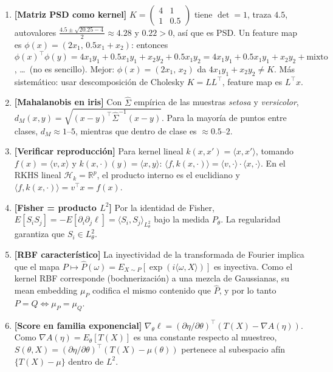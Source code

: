 \begin{enumerate}
	\item \textbf{[Matriz PSD como kernel]} $K = \begin{pmatrix}4&1\\1&0.5\end{pmatrix}$ tiene $\det = 1$, traza $4.5$, autovalores $\frac{4.5\pm\sqrt{20.25-4}}{2} \approx 4.28$ y $0.22 > 0$, así que es PSD. Un feature map es $\phi(x) = (2x_1,\,0.5x_1+x_2)$: entonces $\phi(x)^\top\phi(y) = 4x_1y_1 + 0.5x_1y_1 + x_2y_2 + 0.5x_1y_2 = 4x_1y_1 + 0.5x_1y_1 + x_2y_2 + \text{mixto}$, \dots\ (no es sencillo). Mejor: $\phi(x) = (2x_1,\,x_2)$ da $4x_1y_1 + x_2y_2 \neq K$. Más sistemático: usar descomposición de Cholesky $K = LL^\top$, feature map es $L^\top x$.

	\item \textbf{[Mahalanobis en iris]} Con $\widehat{\Sigma}$ empírica de las muestras \textit{setosa} y \textit{versicolor}, $d_M(x,y) = \sqrt{(x-y)^\top\widehat{\Sigma}^{-1}(x-y)}$. Para la mayoría de puntos entre clases, $d_M \approx 1$--$5$, mientras que dentro de clase es $\approx 0.5$--$2$.

	\item \textbf{[Verificar reproducción]} Para kernel lineal $k(x,x') = \langle x,x'\rangle$, tomando $f(x) = \langle v,x\rangle$ y $k(x,\cdot)(y) = \langle x,y\rangle$: $\langle f, k(x,\cdot)\rangle = \langle v,\cdot\rangle \cdot \langle x,\cdot\rangle$. En el RKHS lineal $\mathcal{H}_k = \mathbb{R}^p$, el producto interno es el euclidiano y $\langle f, k(x,\cdot)\rangle = v^\top x = f(x)$. \checkmark

	\item \textbf{[Fisher = producto $L^2$]} Por la identidad de Fisher, $E[S_i S_j] = -E[\partial_i\partial_j\ell] = \langle S_i, S_j\rangle_{L^2_{\theta}}$ bajo la medida $P_\theta$. La regularidad garantiza que $S_i \in L^2_\theta$.

	\item \textbf{[RBF característico]} La inyectividad de la transformada de Fourier implica que el mapa $P\mapsto \widehat{P}(\omega) = E_{X\sim P}[\exp(i\langle\omega,X\rangle)]$ es inyectiva. Como el kernel RBF corresponde (bochnerización) a una mezcla de Gaussianas, su mean embedding $\mu_P$ codifica el mismo contenido que $\widehat{P}$, y por lo tanto $P=Q \iff \mu_P = \mu_Q$.

	\item \textbf{[Score en familia exponencial]} $\nabla_\theta\ell = (\partial\eta/\partial\theta)^\top(T(X) - \nabla A(\eta))$. Como $\nabla A(\eta) = E_\theta[T(X)]$ es una constante respecto al muestreo, $S(\theta,X) = (\partial\eta/\partial\theta)^\top(T(X) - \mu(\theta))$ pertenece al subespacio afín $\{T(X) - \mu\}$ dentro de $L^2$.


\end{enumerate}
